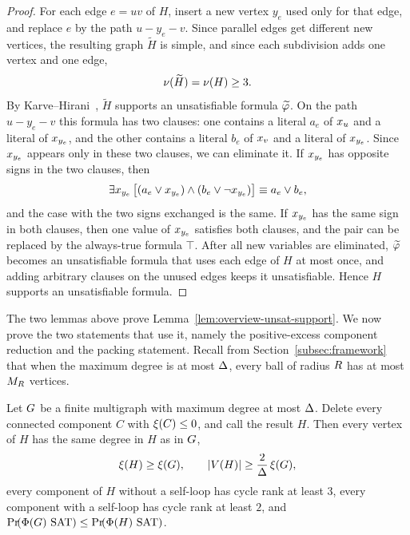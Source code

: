 \begin{proof}
For each edge \(e=uv\) of \(H\), insert a new vertex \(y_e\) used only for that
edge, and replace \(e\) by the path \(u-y_e-v\). Since parallel edges get
different new vertices, the resulting graph \(\widetilde H\) is simple, and
since each subdivision adds one vertex and one edge,
\[
  \nu(\widetilde H)=\nu(H)\ge3.
\]
By Karve--Hirani~\cite[Corollary 19]{KarveHirani2019},
\(\widetilde H\) supports an unsatisfiable formula \(\widetilde{\varphi}\).
On the path \(u-y_e-v\) this formula has two clauses: one contains a literal
\(a_e\) of \(x_{u}\) and a literal of \(x_{y_e}\), and the other contains
a literal \(b_e\) of \(x_{v}\) and a literal of \(x_{y_e}\). Since
\(x_{y_e}\) appears only in these two clauses, we can eliminate it. If
\(x_{y_e}\) has opposite signs in the two clauses, then
\[
  \exists x_{y_e}\,
  \bigl[(a_e\vee x_{y_e})\wedge(b_e\vee \neg x_{y_e})\bigr]
  \equiv
  a_e\vee b_e ,
\]
and the case with the two signs exchanged is the same. If \(x_{y_e}\) has the
same sign in both clauses, then one value of \(x_{y_e}\) satisfies both
clauses, and the pair can be replaced by the always-true formula \(\top\).
After all new variables are eliminated, \(\widetilde{\varphi}\) becomes an
unsatisfiable formula that uses each edge of \(H\) at most once, and adding
arbitrary clauses on the unused edges keeps it unsatisfiable. Hence \(H\)
supports an unsatisfiable formula.
\end{proof}

The two lemmas above prove Lemma~\ref{lem:overview-unsat-support}. We now prove
the two statements that use it, namely the positive-excess component reduction
and the packing statement. Recall from Section~\ref{subsec:framework} that when
the maximum degree is at most \(\Delta\), every ball of radius \(R\) has at
most \(M_{R}\) vertices.

\begin{poscomponentsrestatement}
Let \(G\) be a finite multigraph with maximum degree at most \(\Delta\).
Delete every connected component \(C\) with \(\xi(C)\le0\), and call the
result \(H\). Then every vertex of \(H\) has the same degree in \(H\) as in
\(G\),
\[
  \xi(H)\ge\xi(G),
  \qquad
  |V(H)|\ge\frac{2}{\Delta}\,\xi(G),
\]
every component of \(H\) without a self-loop has cycle rank at least \(3\),
every component with a self-loop has cycle rank at least \(2\), and
\(\Prx{\rform{\Gin}\SAT}\le\Prx{\rform{H}\SAT}\).
\end{poscomponentsrestatement}

